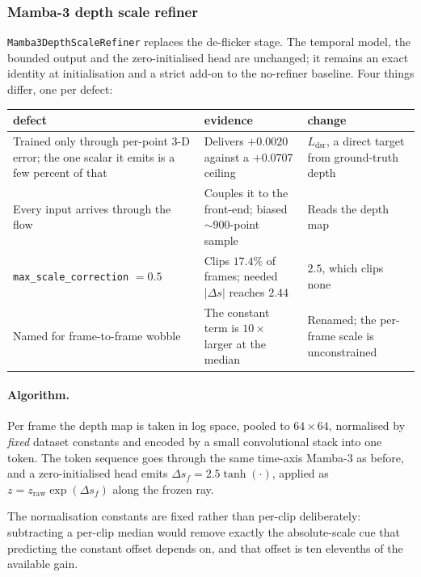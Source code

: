 \documentclass[11pt,a4paper]{article}
\begin{document}
\subsubsection{Mamba-3 depth scale refiner}
\label{sec:depth-scale-refiner}

\texttt{Mamba3DepthScaleRefiner} replaces the de-flicker stage. The temporal model, the bounded
output and the zero-initialised head are unchanged; it remains an exact identity at
initialisation and a strict add-on to the no-refiner baseline. Four things differ, one per defect:

\begin{center}\small
\begin{tabular}{p{4.2cm}p{4.6cm}p{4.6cm}}
\toprule
defect & evidence & change \\
\midrule
Trained only through per-point 3-D error; the one scalar it emits is a few percent of that &
Delivers $+0.0020$ against a $+0.0707$ ceiling &
$L_{\text{dsr}}$, a direct target from ground-truth depth \\
Every input arrives through the flow &
Couples it to the front-end; biased ${\sim}900$-point sample &
Reads the depth map \\
\texttt{max\_scale\_correction} $=0.5$ &
Clips $17.4\%$ of frames; needed $|\Delta s|$ reaches $2.44$ &
$2.5$, which clips none \\
Named for frame-to-frame wobble &
The constant term is $10\times$ larger at the median &
Renamed; the per-frame scale is unconstrained \\
\bottomrule
\end{tabular}
\end{center}

\paragraph{Algorithm.} Per frame the depth map is taken in log space, pooled to $64\times64$,
normalised by \emph{fixed} dataset constants and encoded by a small convolutional stack into one
token. The token sequence goes through the same time-axis Mamba-3 as before, and a zero-initialised
head emits $\Delta s_f = 2.5\tanh(\cdot)$, applied as $z = z_{\text{raw}}\exp(\Delta s_f)$ along the
frozen ray.

The normalisation constants are fixed rather than per-clip deliberately: subtracting a per-clip
median would remove exactly the absolute-scale cue that predicting the constant offset depends on,
and that offset is ten elevenths of the available gain.
\end{document}
